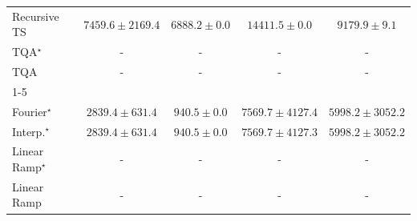 \begin{tabular}{l|cccc|}
Recursive TS & {\cellcolor[HTML]{FEFFE2}} \color[HTML]{000000} $7459.6\pm 2169.4$ & {\cellcolor[HTML]{FFFFE5}} \color[HTML]{000000} $6888.2\pm 0.0$ & {\cellcolor[HTML]{F1FAB5}} \color[HTML]{000000} $14411.5\pm 0.0$ & {\cellcolor[HTML]{FCFED6}} \color[HTML]{000000} $9179.9\pm 9.1$ \\
TQA$^\star$ & {\cellcolor[HTML]{000000}} \color[HTML]{F1F1F1} {\cellcolor{white}} \color{black} - & {\cellcolor[HTML]{000000}} \color[HTML]{F1F1F1} {\cellcolor{white}} \color{black} - & {\cellcolor[HTML]{000000}} \color[HTML]{F1F1F1} {\cellcolor{white}} \color{black} - & {\cellcolor[HTML]{000000}} \color[HTML]{F1F1F1} {\cellcolor{white}} \color{black} - \\
TQA & {\cellcolor[HTML]{000000}} \color[HTML]{F1F1F1} {\cellcolor{white}} \color{black} - & {\cellcolor[HTML]{000000}} \color[HTML]{F1F1F1} {\cellcolor{white}} \color{black} - & {\cellcolor[HTML]{000000}} \color[HTML]{F1F1F1} {\cellcolor{white}} \color{black} - & {\cellcolor[HTML]{000000}} \color[HTML]{F1F1F1} {\cellcolor{white}} \color{black} - \\
\cline{1-5}
\multicolumn{5}{c}{\rule{0pt}{8pt}SV} \\
\midrule
Fourier$^\star$ & {\cellcolor[HTML]{C4CBE3}} \color[HTML]{000000} $2839.4\pm 631.4$ & {\cellcolor[HTML]{FFF7FB}} \color[HTML]{000000} $940.5\pm 0.0$ & {\cellcolor[HTML]{023858}} \color[HTML]{F1F1F1} $7569.7\pm 4127.4$ & {\cellcolor[HTML]{056DAC}} \color[HTML]{F1F1F1} $5998.2\pm 3052.2$ \\
Interp.$^\star$ & {\cellcolor[HTML]{C4CBE3}} \color[HTML]{000000} $2839.4\pm 631.4$ & {\cellcolor[HTML]{FFF7FB}} \color[HTML]{000000} $940.5\pm 0.0$ & {\cellcolor[HTML]{023858}} \color[HTML]{F1F1F1} $7569.7\pm 4127.3$ & {\cellcolor[HTML]{056DAC}} \color[HTML]{F1F1F1} $5998.2\pm 3052.2$ \\
Linear Ramp$^\star$ & {\cellcolor[HTML]{000000}} \color[HTML]{F1F1F1} {\cellcolor{white}} \color{black} - & {\cellcolor[HTML]{000000}} \color[HTML]{F1F1F1} {\cellcolor{white}} \color{black} - & {\cellcolor[HTML]{000000}} \color[HTML]{F1F1F1} {\cellcolor{white}} \color{black} - & {\cellcolor[HTML]{000000}} \color[HTML]{F1F1F1} {\cellcolor{white}} \color{black} - \\
Linear Ramp & {\cellcolor[HTML]{000000}} \color[HTML]{F1F1F1} {\cellcolor{white}} \color{black} - & {\cellcolor[HTML]{000000}} \color[HTML]{F1F1F1} {\cellcolor{white}} \color{black} - & {\cellcolor[HTML]{000000}} \color[HTML]{F1F1F1} {\cellcolor{white}} \color{black} - & {\cellcolor[HTML]{000000}} \color[HTML]{F1F1F1} {\cellcolor{white}} \color{black} - \\

\end{tabular}
